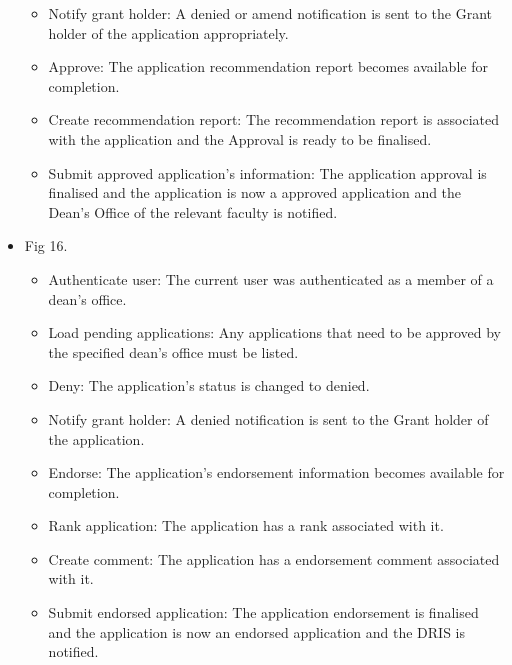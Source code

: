 \documentclass[12pt]{article}
\begin{document}
\begin{itemize}
\begin{itemize}
			\item Notify grant holder: A denied or amend notification is sent to the Grant holder of the application appropriately.  
			\item Approve: The application recommendation report becomes available for completion.
			\item Create recommendation report: The recommendation report is associated with the application and the Approval is ready to be finalised.				
			\item Submit approved application's information: The application approval is finalised and the application is now a approved application and the Dean's Office of the relevant faculty is notified.									
		\end{itemize}
		
	\item Fig 16.
		\begin{itemize}
			\item Authenticate user: The current user was authenticated as a member of a dean's office.
			\item Load pending applications: Any applications that need to be approved by the specified dean's office must be listed.
			\item Deny: The application's status is changed to denied. 
			\item Notify grant holder: A denied notification is sent to the Grant holder of the application.
			\item Endorse: The application's endorsement information becomes available for completion.
			\item Rank application: The application has a rank associated with it.	
			\item Create comment: The application has a endorsement comment associated with it.			
			\item Submit endorsed application: The application endorsement is finalised and the application is now an endorsed application and the DRIS is notified.									
		\end{itemize}
	

\end{itemize}
\end{document}
